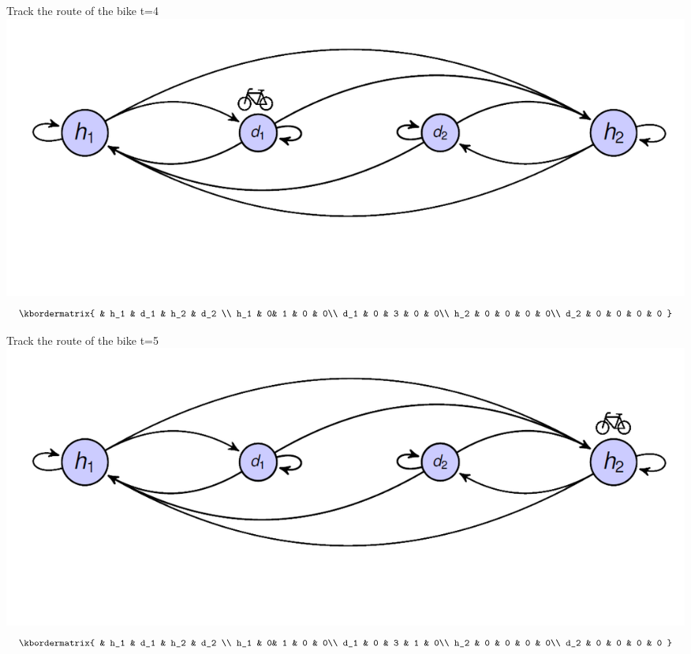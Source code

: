 \begin{frame}{Track the route of the bike}
t=4
\includegraphics[width=\linewidth]{graphics/createmarkov_firststep}		
\[
	\kbordermatrix{ 
	&  h_1 &  d_1  &  h_2  &  d_2 \\
	h_1  &  0& 1 & 0 & 0\\
	d_1 & 0  & 3 & 0  & 0\\
	h_2  & 0 & 0   & 0 & 0\\
	d_2  & 0  & 0   & 0  & 0
}
\]	
\end{frame}

\begin{frame}{Track the route of the bike}
	t=5
	\includegraphics[width=\linewidth]{graphics/createmarkov_laststep}		
	\[
	\kbordermatrix{ 
		&  h_1 &  d_1  &  h_2  &  d_2 \\
		h_1  &  0& 1 & 0 & 0\\
		d_1 & 0  & 3 & 1  & 0\\
		h_2  & 0 & 0   & 0 & 0\\
		d_2  & 0  & 0   & 0  & 0
	}
	\]	
\end{frame}


